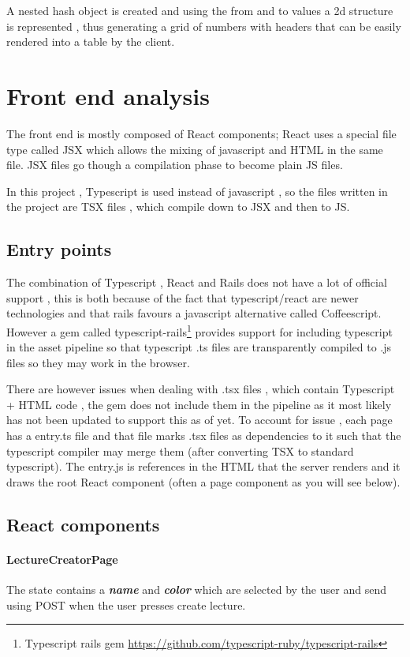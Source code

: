 A nested hash object is created and using the from and to values a 2d structure is represented , thus generating a grid of numbers with headers that can be easily rendered into a table by the client.

\section{Front end analysis}
The front end is mostly composed of React components; React uses a special file type called JSX\cite{jsx} which allows the mixing of javascript and HTML in the same file. JSX files go though a compilation phase to become plain JS files.

In this project , Typescript is used instead of javascript , so the files written in the project are TSX files , which compile down to JSX and then to JS.

\subsection{Entry points}
The combination of Typescript , React and Rails does not have a lot of official support , this is both because of the fact that typescript/react are newer technologies and that rails favours a javascript alternative called Coffeescript. However a gem called typescript-rails\footnote{Typescript rails gem \url{https://github.com/typescript-ruby/typescript-rails}} provides support for including typescript in the asset pipeline so that typescript .ts files are transparently compiled to .js files so they may work in the browser.

There are however issues when dealing with .tsx files , which contain Typescript + HTML code , the gem does not include them in the pipeline as it most likely has not been updated to support this as of yet. To account for issue , each page has a entry.ts file and that file marks .tsx files as dependencies to it such that the typescript compiler may merge them (after converting TSX to standard typescript). The entry.js is references in the HTML that the server renders and it draws the root React component (often a page component as you will see below).

\subsection{React components}
\paragraph{LectureCreatorPage} The state contains a \textit{\textbf{name}} and \textit{\textbf{color}} which are selected by the user and send using POST when the user presses create lecture.
